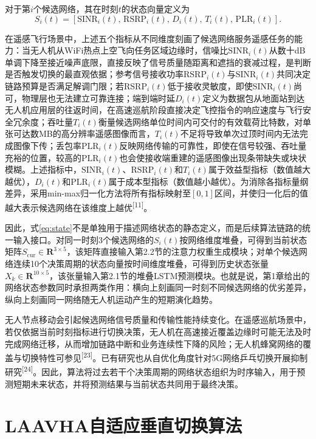 \documentclass[10pt,a4paper]{ctexart}
\newcommand{\upcite}[1]{\textsuperscript{[#1]}}
\begin{document}
对于第$i$个候选网络，其在时刻$t$的状态向量定义为
\begin{equation}
S_i(t)=\left[\mathrm{SINR}_i(t),\,\mathrm{RSRP}_i(t),\,D_i(t),\,T_i(t),\,\mathrm{PLR}_i(t)\right].
\label{eq:state}
\end{equation}

在遥感飞行场景中，上述五个指标从不同维度刻画了候选网络服务遥感任务的能力：当无人机从WiFi热点上空飞向任务区域边缘时，信噪比$\mathrm{SINR}_i(t)$从数十dB单调下降至接近噪声底限，直接反映了信号质量随距离和遮挡的衰减过程，是判断是否触发切换的最直观依据；参考信号接收功率$\mathrm{RSRP}_i(t)$与$\mathrm{SINR}_i(t)$共同决定链路预算是否满足解调门限；若$\mathrm{RSRP}_i(t)$低于接收灵敏度，即使$\mathrm{SINR}_i(t)$尚可，物理层也无法建立可靠连接；端到端时延$D_i(t)$定义为数据包从地面站到达无人机应用层的往返时间，在高速巡航阶段直接决定飞控指令的响应速度与飞行安全冗余度；吞吐量$T_i(t)$衡量候选网络单位时间内可交付的有效载荷比特数，对单张可达数MB的高分辨率遥感图像而言，$T_i(t)$不足将导致单次过顶时间内无法完成图像下传；丢包率$\mathrm{PLR}_i(t)$反映网络传输的可靠性，即使在信号较强、吞吐量充裕的位置，较高的$\mathrm{PLR}_i(t)$也会使接收端重建的遥感图像出现条带缺失或块状模糊。上述指标中，$\mathrm{SINR}_i(t)$、$\mathrm{RSRP}_i(t)$和$T_i(t)$属于效益型指标（数值越大越优），$D_i(t)$和$\mathrm{PLR}_i(t)$属于成本型指标（数值越小越优）。为消除各指标量纲差异，采用min-max归一化方法将所有指标映射至$[0,1]$区间，并使归一化后的值越大表示候选网络在该维度上越优\upcite{11}。

因此，式\eqref{eq:state}不是单独用于描述网络状态的静态定义，而是后续算法链路的统一输入接口。对同一时刻3个候选网络的$S_i(t)$按网络维度堆叠，可得到当前状态矩阵$S_{\mathrm{cur}}\in\mathbf{R}^{3\times5}$，该矩阵直接输入第2.2节的注意力权重生成模块；对单个候选网络连续10个决策周期的状态向量按时间维度堆叠，可得到历史状态张量$X_k\in\mathbf{R}^{10\times5}$，该张量输入第2.1节的堆叠LSTM预测模块。也就是说，第1章给出的网络状态参数同时承担两类作用：横向上刻画同一时刻不同候选网络的优劣差异，纵向上刻画同一网络随无人机运动产生的短期演化趋势。

无人节点移动会引起候选网络信号质量和传输性能持续变化。在遥感巡航场景中，若仅依据当前时刻指标进行切换决策，无人机在高速接近覆盖边缘时可能无法及时完成网络迁移，从而增加链路中断和业务连续性下降的风险；无人机蜂窝网络的覆盖与切换特性可参见\upcite{23}。已有研究也从自优化角度针对5G网络乒乓切换开展抑制研究\upcite{24}。因此，算法将过去若干个决策周期的网络状态组织为时序输入，用于预测短期未来状态，并将预测结果与当前状态共同用于最终决策。

\section{LAAVHA自适应垂直切换算法}
\end{document}
